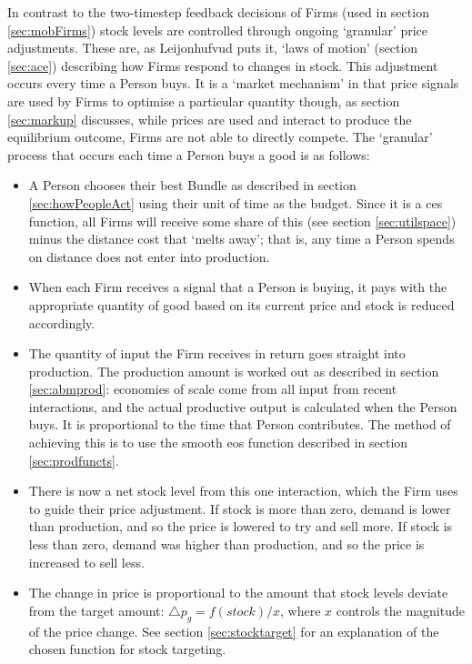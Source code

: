 In contrast to the two-timestep feedback decisions of Firms (used in section \ref{sec:mobFirms}) stock levels are controlled through ongoing `granular' price adjustments. These are, as Leijonhufvud puts it, `laws of motion' (section \ref{sec:ace}) describing how Firms respond to changes in stock. This adjustment occurs every time a Person buys. It is a `market mechanism' in that price signals are used by Firms to optimise a particular quantity though, as section \ref{sec:markup} discusses, while prices are used and interact to produce the equilibrium outcome, Firms are not able to directly compete. The `granular' process that occurs each time a Person buys a good is as follows:

\begin{itemize}
\item A Person chooses their best Bundle as described in section \ref{sec:howPeopleAct} using their unit of time as the budget. Since it is a \gls{ces} function, all Firms will receive some share of this (see section \ref{sec:utilspace}) minus the distance cost that `melts away'; that is, any time a Person spends on distance does not enter into production.
\item When each Firm receives a signal that a Person is buying, it pays with the appropriate quantity of good based on its current price and stock is reduced accordingly. 
\item The quantity of input the Firm receives in return goes straight into production. The production amount is worked out as described in section \ref{sec:abmprod}: economies of scale come from all input from recent interactions, and the actual productive output is calculated when the Person buys. It is proportional to the time that Person contributes. The method of achieving this is to use the smooth \gls{eos} function described in section \ref{sec:prodfuncts}.
\item There is now a net stock level from this one interaction, which the Firm uses to guide their price adjustment. If stock is more than zero, demand is lower than production, and so the price is lowered to try and sell more. If stock is less than zero, demand was higher than production, and so the price is increased to sell less. 
\item The change in price is proportional to the amount that stock levels deviate from the target amount: $\triangle p_g = f(stock)/x$, where $x$ controls the magnitude of the price change. See section \ref{sec:stocktarget} for an explanation of the chosen function for stock targeting.
\end{itemize}

